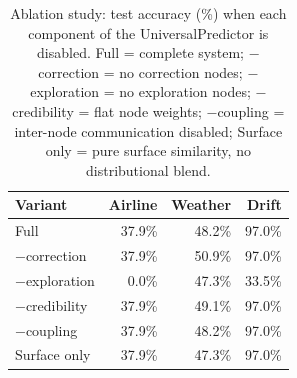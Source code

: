 \begin{table}[h]
\centering
\caption{Ablation study: test accuracy (\%) when each component of the UniversalPredictor is disabled. Full = complete system; $-$correction = no correction nodes; $-$exploration = no exploration nodes; $-$credibility = flat node weights; $-$coupling = inter-node communication disabled; Surface only = pure surface similarity, no distributional blend.}
\label{tab:ablation}
\begin{tabular}{lrrr}
\toprule
Variant & Airline & Weather & Drift \\
\midrule
Full & 37.9\% & 48.2\% & 97.0\% \\
$-$correction & 37.9\% & 50.9\% & 97.0\% \\
$-$exploration & 0.0\% & 47.3\% & 33.5\% \\
$-$credibility & 37.9\% & 49.1\% & 97.0\% \\
$-$coupling & 37.9\% & 48.2\% & 97.0\% \\
Surface only & 37.9\% & 47.3\% & 97.0\% \\
\bottomrule
\end{tabular}
\end{table}
